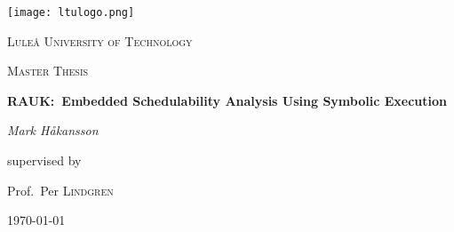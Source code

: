 \begin{titlepage}
    \centering
    \texttt{[image: ltulogo.png]}\par\vspace{1cm}
    {\scshape\LARGE Luleå University of Technology\par}
    \vspace{1cm}
    {\scshape\Large Master Thesis\par}
    \vspace{1.5cm}
    {\huge\bfseries RAUK:\ Embedded Schedulability Analysis Using Symbolic Execution\par}
    \vspace{2cm}
    {\Large\textit{Mark Håkansson}\par}
    \vfill
    supervised by\par
    Prof.~Per \textsc{Lindgren}
    \vfill
    {\large \today\par}
\end{titlepage}
